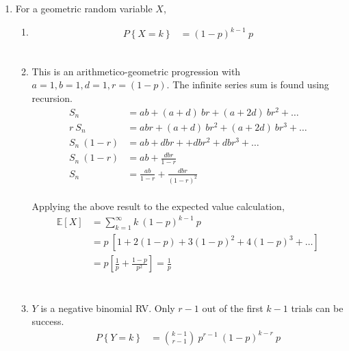 \begin{enumerate}
	
	\item For a geometric random variable $ X $,\\
	
		\begin{enumerate}
			\item \begin{align}
				P \left\{X = k\right\} &= (1-p)^{k-1}\ p 
			\end{align}\\
			
			\item This is an arithmetico-geometric progression with $ a = 1, b = 1, d = 1, r = (1-p) $. The infinite series sum is found using recursion.\\
			
			\begin{align}
				S_n &= ab + (a+d)\ br + (a+2d)\ br^2 + \dots \nonumber \\
				r\ S_n &= abr + (a+d)\ br^2 + (a+2d)\ br^3 + \dots \nonumber \\
				S_n\ (1-r) &= ab + dbr + +dbr^2 + dbr^3 + \dots \nonumber \\
				S_n\ (1-r) &= ab + \frac{dbr}{1-r} \nonumber \\
				S_n &= \frac{ab}{1-r} + \frac{dbr}{(1-r)^2}
			\end{align}\\
			
			Applying the above result to the expected value calculation, \\
			
			\begin{align}
				\mathbb{E}[X] &= \sum\limits_{k = 1}^{\infty} k \ (1-p)^{k-1}\ p \nonumber \\
				&= p\ \left[1 + 2(1-p) + 3(1-p)^2 + 4(1-p)^3 + \dots\right]		\nonumber \\
				&= p \left[\frac{1}{p} + \frac{1-p}{p^2}\right]	= \frac{1}{p} \\
			\end{align}\\
			
			\item $ Y $ is a negative binomial RV. Only $ r-1 $ out of the first $ k-1 $ trials can be success. \\
			\begin{align}
				P \left\{Y = k\right\} &= \binom{k-1}{r-1}\ p^{r-1}\ (1-p)^{k-r}\ p \\
			\end{align}
			

\end{enumerate}
\end{enumerate}
